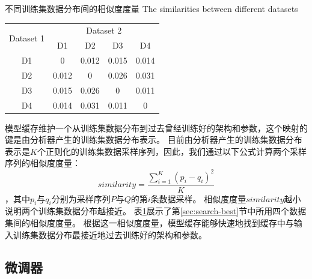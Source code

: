 \begin{table}[!hpb]
  \centering
  \bicaption[不同训练集数据分布间的相似度度量]
    {不同训练集数据分布间的相似度度量}
    {The similarities between different datasets}
  \label{tab:similarity}
  \begin{tabular}{ccccc}
    \toprule
    \multirow{2}{*}{Dataset 1}  & \multicolumn{4}{c}{Dataset 2}              \\ \cmidrule{2-5}
                                & D1   & D2   & D3   & D4   \\ \midrule
    D1                          & 0  & 0.012  & 0.015  & 0.014  \\
    D2                          & 0.012  & 0  & 0.026  & 0.031  \\
    D3                          & 0.015  & 0.026  & 0  & 0.011  \\
    D4                          & 0.014  & 0.031  & 0.011  & 0  \\ \bottomrule
  \end{tabular}
\end{table}

模型缓存维护一个从训练集数据分布到过去曾经训练好的{\rmi}架构和参数，这个映射的键是由分析器产生的训练集数据分布表示。
目前由分析器产生的训练集数据分布表示是$K$个正则化的训练集数据采样序列，因此，我们通过以下公式计算两个采样序列的相似度度量：
\[
  similarity = \frac{ \sum_{i=1}^{K} (p_i - q_i)^2 }{ K }
\]
，其中$p_i$与$q_i$分别为采样序列$P$与$Q$的第$i$条数据采样。
相似度度量$similarity$越小说明两个训练集数据分布越接近。
表\ref{tab:similarity}展示了第\ref{sec:search-best}节中所用四个数据集间的相似度度量。
根据这一相似度度量，模型缓存能够快速地找到缓存中与输入训练集数据分布最接近地过去训练好的{\rmi}架构和参数。


\subsection{微调器}

